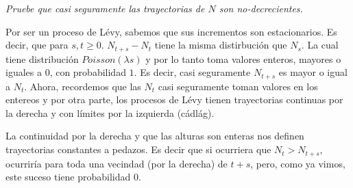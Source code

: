 \emph{
	Pruebe que casi seguramente las trayectorias de $N$ son no-decrecientes.
}

\afterstatement\pn

Por ser un proceso de Lévy, sabemos que sus incrementos son estacionarios. Es decir, que para $s,t \geq 0$.
$N_{t+s} - N_t$ tiene la misma distirbución que $N_s$. La cual tiene distribución $Poisson(\lambda s)$ y
por lo tanto toma valores enteros, mayores o iguales a $0$, con probabilidad $1$. Es decir, casi seguramente
$N_{t+s}$ es mayor o igual a $N_t$. Ahora, recordemos que las $N_t$ casi seguramente toman valores en los entereos y por otra parte, 
los procesos de Lévy tienen trayectorias continuas por la derecha y con límites por la izquierda (cádlág).\pn

La continuidad por la derecha y que las alturas son enteras nos definen trayectorias constantes a pedazos.
Es decir que si ocurriera que $N_t > N_{t+s}$, ocurriría para toda una vecindad (por la derecha) de $t+s$, pero, como
ya vimos, este suceso tiene probabilidad $0$.